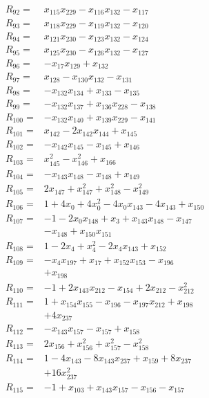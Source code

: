 \begin{align*}
R_{92}={}&x_{115}x_{229} -x_{116}x_{132} -x_{117}\\[3pt]
R_{93}={}&x_{118}x_{229} -x_{119}x_{132} -x_{120}\\[3pt]
R_{94}={}&x_{121}x_{230} -x_{123}x_{132} -x_{124}\\[3pt]
R_{95}={}&x_{125}x_{230} -x_{126}x_{132} -x_{127}\\[3pt]
R_{96}={}&-x_{17}x_{129} +x_{132}\\[3pt]
R_{97}={}&x_{128} -x_{130}x_{132} -x_{131}\\[3pt]
R_{98}={}&-x_{132}x_{134} +x_{133} -x_{135}\\[3pt]
R_{99}={}&-x_{132}x_{137} +x_{136}x_{228} -x_{138}\\[3pt]
R_{100}={}&-x_{132}x_{140} +x_{139}x_{229} -x_{141}\\[3pt]
R_{101}={}&x_{142} -2x_{142}x_{144} +x_{145}\\[3pt]
R_{102}={}&-x_{142}x_{145} -x_{145} +x_{146}\\[3pt]
R_{103}={}&x_{145}^{2} -x_{146}^{2} +x_{166}\\[3pt]
R_{104}={}&-x_{143}x_{148} -x_{148} +x_{149}\\[3pt]
R_{105}={}&2x_{147} +x_{147}^{2} +x_{148}^{2} -x_{149}^{2}\\[3pt]
R_{106}={}&1 +4x_{0} +4x_{0}^{2} -4x_{0}x_{143} -4x_{143} +x_{150}\\[3pt]
R_{107}={}&-1 -2x_{0}x_{148} +x_{3} +x_{143}x_{148} -x_{147}\\
&-x_{148} +x_{150}x_{151}\\[3pt]
R_{108}={}&1 -2x_{4} +x_{4}^{2} -2x_{4}x_{143} +x_{152}\\[3pt]
R_{109}={}&-x_{4}x_{197} +x_{17} +x_{152}x_{153} -x_{196}\\
&+x_{198}\\[3pt]
R_{110}={}&-1 +2x_{143}x_{212} -x_{154} +2x_{212} -x_{212}^{2}\\[3pt]
R_{111}={}&1 +x_{154}x_{155} -x_{196} -x_{197}x_{212} +x_{198}\\
&+4x_{237}\\[3pt]
R_{112}={}&-x_{143}x_{157} -x_{157} +x_{158}\\[3pt]
R_{113}={}&2x_{156} +x_{156}^{2} +x_{157}^{2} -x_{158}^{2}\\[3pt]
R_{114}={}&1 -4x_{143} -8x_{143}x_{237} +x_{159} +8x_{237}\\
&+16x_{237}^{2}\\[3pt]
R_{115}={}&-1 +x_{103} +x_{143}x_{157} -x_{156} -x_{157}\\

\end{align*}
